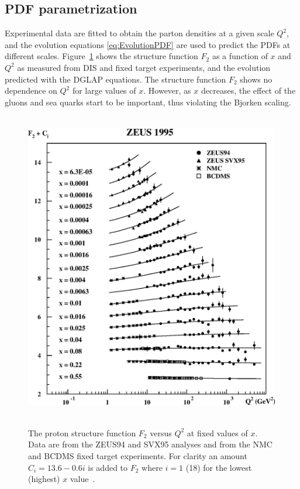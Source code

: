 \subsection{PDF parametrization}

Experimental data are fitted to obtain the parton densities at a given scale $Q^2$, and the evolution equations \ref{eq:EvolutionPDF} are used to predict the PDFs at different scales.
Figure~\ref{fig:DIS_F2fit} shows the structure function $F_2$ as a function of $x$ and $Q^2$ as measured from DIS and fixed target experiments, and the evolution predicted with the DGLAP equations.
The structure function $F_2$ shows no dependence on $Q^2$ for large values of $x$.
However, as $x$ decreases, the effect of the gluons and sea quarks start to be important, thus violating the Bjorken scaling.

\begin{figure}[!t]
  \begin{center}
    \mbox{
        \includegraphics[width=0.995\textwidth]{StandardModel/Figures/StructureFunctionZEUS.eps}
    }
  \end{center}
  \caption[The proton structure function $F_2$ versus $Q^2$ at fixed values of $x$.]{The proton structure function $F_2$ versus $Q^2$ at fixed values of $x$. Data are from the ZEUS94 and SVX95 analyses and from the NMC and BCDMS fixed target experiments. For clarity an amount $C_i = 13.6-0.6i$ is added to $F_2$ where $i=1$ (18) for the lowest (highest) $x$ value~\cite{Breitweg:1998dz}.}
  \label{fig:DIS_F2fit}
\end{figure}

